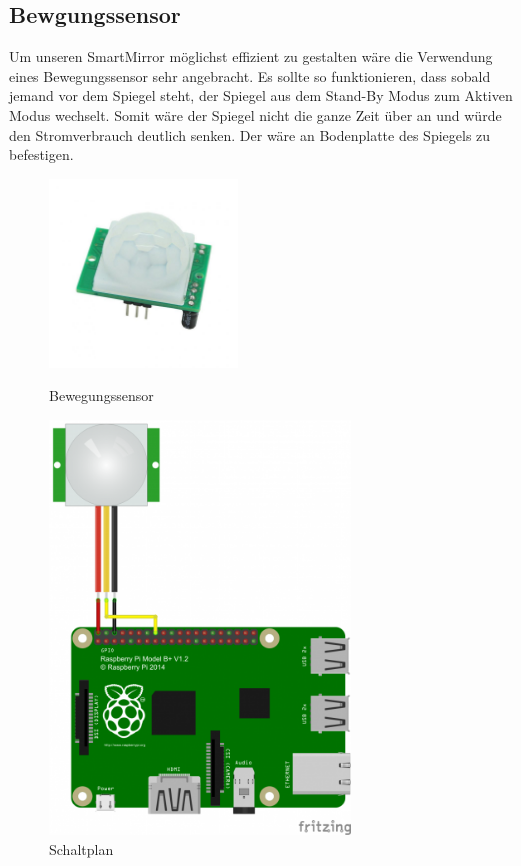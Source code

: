 \subsection{Bewgungssensor}
Um unseren SmartMirror möglichst effizient zu gestalten wäre die Verwendung eines Bewegungssensor sehr angebracht. Es sollte so funktionieren, dass sobald jemand vor dem Spiegel steht, der Spiegel aus dem Stand-By Modus zum Aktiven Modus wechselt. Somit wäre der Spiegel nicht die ganze Zeit über an und würde den Stromverbrauch deutlich senken. Der wäre an Bodenplatte des Spiegels zu befestigen. 
\begin{figure}
\includegraphics[width=50mm]{pictures/Bewegungssensor.jpg}
\caption{Bewegungssensor}
\includegraphics[width=80mm]{pictures/Bewegungssensor_Plan.png}
\caption{Schaltplan}
\end{figure}
